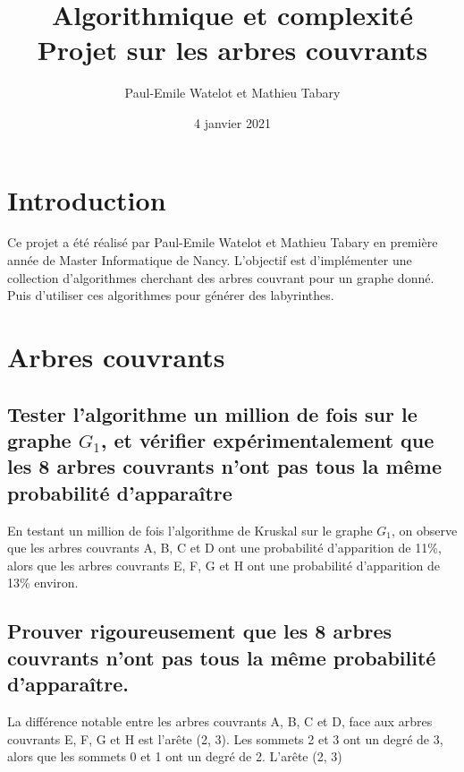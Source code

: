 \documentclass[11pt]{article}
\title{Algorithmique et complexité Projet sur les arbres couvrants}
\author{Paul-Emile Watelot et Mathieu Tabary}
\date{4 janvier 2021}
\begin{document}
    \maketitle

    \section{Introduction}\label{sec:introduction}
        Ce projet a été réalisé par Paul-Emile Watelot et Mathieu Tabary en première année de Master Informatique de Nancy.
        L'objectif est d'implémenter une collection d'algorithmes cherchant des arbres couvrant pour un graphe donné.
        Puis d'utiliser ces algorithmes pour générer des labyrinthes.
    
    \section{Arbres couvrants}\label{sec:arbres-couvrants}
        
        \newpage

        \subsection{Tester l'algorithme un million de fois sur le graphe $G_1$,
        et vérifier expérimentalement que les 8 arbres couvrants n'ont pas tous la même probabilité d'apparaître}\label{subsec:Q3}
            En testant un million de fois l'algorithme de Kruskal sur le graphe $G_1$,
            on observe que les arbres couvrants A, B, C et D ont une probabilité d'apparition de 11\%,
            alors que les arbres couvrants E, F, G et H ont une probabilité d'apparition de 13\% environ.
    
        \subsection{Prouver rigoureusement que les 8 arbres couvrants n'ont pas tous la même probabilité d'apparaître.}\label{subsec:Q4}
            La différence notable entre les arbres couvrants A, B, C et D, face aux arbres couvrants E, F, G et H est l'arête (2, 3).
            Les sommets 2 et 3 ont un degré de 3, alors que les sommets 0 et 1 ont un degré de 2.
            L'arête (2, 3)
\end{document}
